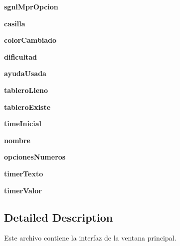 \begin{DoxyCompactItemize}
\item 
\hypertarget{namespace_sudoku_main_window_ab8a2812d835b8ddd5f3823e3f83dcd69}{{\bfseries sgnl\-Mpr\-Opcion}}\label{namespace_sudoku_main_window_ab8a2812d835b8ddd5f3823e3f83dcd69}

\item 
\hypertarget{namespace_sudoku_main_window_adf7c10c6c7091df5ff85852f4fd1553c}{{\bfseries casilla}}\label{namespace_sudoku_main_window_adf7c10c6c7091df5ff85852f4fd1553c}

\item 
\hypertarget{namespace_sudoku_main_window_ac90bccc34d2ae1b9290a35f4ea4c36fe}{{\bfseries color\-Cambiado}}\label{namespace_sudoku_main_window_ac90bccc34d2ae1b9290a35f4ea4c36fe}

\item 
\hypertarget{namespace_sudoku_main_window_a4e9f486d8684b47f36acac1ad901793a}{{\bfseries dificultad}}\label{namespace_sudoku_main_window_a4e9f486d8684b47f36acac1ad901793a}

\item 
\hypertarget{namespace_sudoku_main_window_a4e910cd3545b3130b693c477b3d7b2b6}{{\bfseries ayuda\-Usada}}\label{namespace_sudoku_main_window_a4e910cd3545b3130b693c477b3d7b2b6}

\item 
\hypertarget{namespace_sudoku_main_window_a82730cf4fa62f4f9398874b505666b40}{{\bfseries tablero\-Lleno}}\label{namespace_sudoku_main_window_a82730cf4fa62f4f9398874b505666b40}

\item 
\hypertarget{namespace_sudoku_main_window_ad033265b1572d8a982732d2803f9bbe1}{{\bfseries tablero\-Existe}}\label{namespace_sudoku_main_window_ad033265b1572d8a982732d2803f9bbe1}

\item 
\hypertarget{namespace_sudoku_main_window_a917c254f0ca37f474edd1a1f8370ae96}{{\bfseries time\-Inicial}}\label{namespace_sudoku_main_window_a917c254f0ca37f474edd1a1f8370ae96}

\item 
\hypertarget{namespace_sudoku_main_window_ac1eeac23bbc2b82b4946f7f0a0bfe96d}{{\bfseries nombre}}\label{namespace_sudoku_main_window_ac1eeac23bbc2b82b4946f7f0a0bfe96d}

\item 
\hypertarget{namespace_sudoku_main_window_a018eceecf733b29bf03f5e7fc4c4bc75}{{\bfseries opciones\-Numeros}}\label{namespace_sudoku_main_window_a018eceecf733b29bf03f5e7fc4c4bc75}

\item 
\hypertarget{namespace_sudoku_main_window_a0defbcc751881aff8400f31a37213bab}{{\bfseries timer\-Texto}}\label{namespace_sudoku_main_window_a0defbcc751881aff8400f31a37213bab}

\item 
\hypertarget{namespace_sudoku_main_window_a4b28c0a6fa52e10c4c5ccb94ec218cb3}{{\bfseries timer\-Valor}}\label{namespace_sudoku_main_window_a4b28c0a6fa52e10c4c5ccb94ec218cb3}

\end{DoxyCompactItemize}


\subsection{Detailed Description}
Este archivo contiene la interfaz de la ventana principal. 